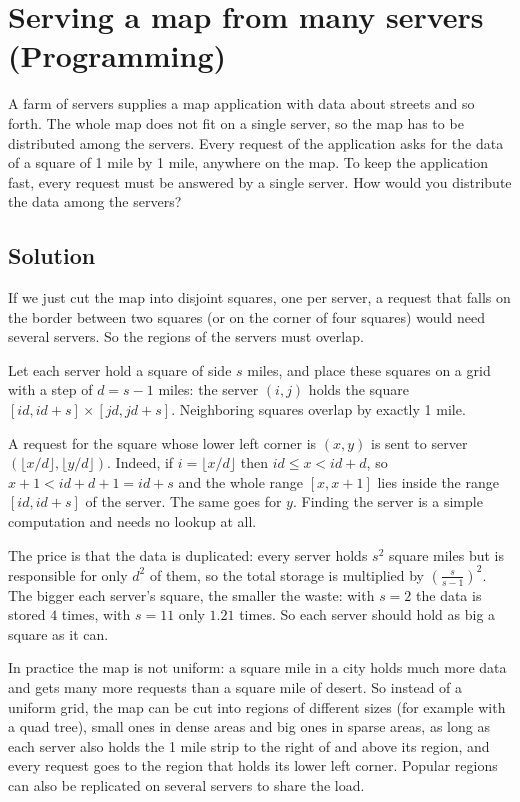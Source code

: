 \section {Serving a map from many servers (Programming)}

A farm of servers supplies a map application with data about streets and so forth.
The whole map does not fit on a single server, so the map has to be distributed among the servers.
Every request of the application asks for the data of a square of 1 mile by 1 mile, anywhere on the map.
To keep the application fast, every request must be answered by a single server.
How would you distribute the data among the servers?

\subsection{Solution}

If we just cut the map into disjoint squares, one per server, a request that falls on the border between two
squares (or on the corner of four squares) would need several servers. So the regions of the servers must overlap.

Let each server hold a square of side $s$ miles, and place these squares on a grid with a step of $d = s-1$ miles:
the server $(i,j)$ holds the square $[id, id+s] \times [jd, jd+s]$.
Neighboring squares overlap by exactly 1 mile.

A request for the square whose lower left corner is $(x,y)$ is sent to server $(\lfloor x/d \rfloor, \lfloor y/d \rfloor)$.
Indeed, if $i = \lfloor x/d \rfloor$ then $id \le x < id+d$, so $x+1 < id+d+1 = id+s$ and the whole range $[x,x+1]$ lies inside
the range $[id, id+s]$ of the server. The same goes for $y$.
Finding the server is a simple computation and needs no lookup at all.

The price is that the data is duplicated: every server holds $s^2$ square miles but is responsible for only $d^2$ of them,
so the total storage is multiplied by $\left(\frac{s}{s-1}\right)^2$.
The bigger each server's square, the smaller the waste: with $s=2$ the data is stored $4$ times, with $s=11$ only $1.21$ times.
So each server should hold as big a square as it can.

In practice the map is not uniform: a square mile in a city holds much more data and gets many more requests than a square mile of desert.
So instead of a uniform grid, the map can be cut into regions of different sizes (for example with a quad tree), small ones in dense areas and big ones in
sparse areas, as long as each server also holds the 1 mile strip to the right of and above its region, and every request goes to the region that holds its lower left corner. Popular regions can also be replicated on several servers to share the load.
